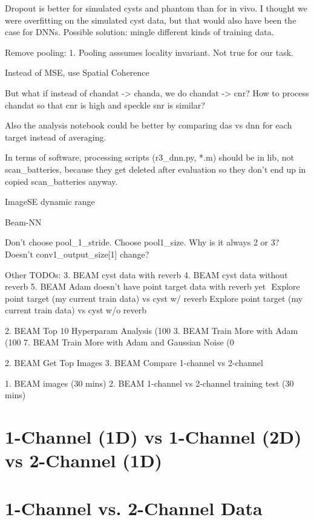 \documentclass{article}
\begin{document}
Dropout is better for simulated cysts and phantom than for in vivo. I thought we were overfitting on the simulated cyst data, but that would also have been the case for DNNs. Possible solution: mingle different kinds of training data.


Remove pooling:
1. Pooling asssumes locality invariant. Not true for our task.

Instead of MSE, use Spatial Coherence

But what if instead of chandat -> chanda, we do chandat -> cnr? How to process chandat so that cnr is high and speckle snr is similar?


Also the analysis notebook could be better by comparing das vs dnn for each target instead of averaging.

In terms of software, processing scripts (r3_dnn.py, *.m) should be in lib, not scan_batteries, because they get deleted after evaluation so they don’t end up in copied scan_batteries anyway.

ImageSE dynamic range

Beam-NN

Don’t choose pool_1_stride. Choose pool1_size. Why is it always 2 or 3? Doesn’t conv1_output_size[1] change?

Other TODOs:
3. BEAM cyst data with reverb
4. BEAM cyst data without reverb
5. BEAM Adam doesn’t have point target data with reverb yet 
Explore point target (my current train data) vs cyst w/ reverb Explore point target (my current train data) vs cyst w/o reverb

2. BEAM Top 10 Hyperparam Analysis (100%
3. BEAM Train More with Adam (100%
7. BEAM Train More with Adam and Gaussian Noise (0%


2. BEAM Get Top Images
3. BEAM Compare 1-channel vs 2-channel

1. BEAM images (30 mins)
2. BEAM 1-channel vs 2-channel training test (30 mins)


\section{1-Channel (1D) vs 1-Channel (2D) vs 2-Channel (1D)}
\section{1-Channel vs. 2-Channel Data}


\clearpage


\end{document}

